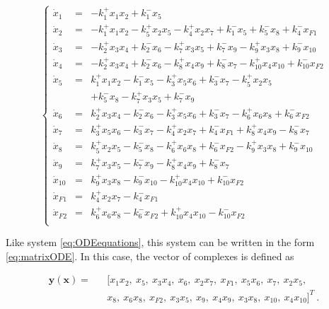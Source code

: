     \begin{equation} \label{eq:ODEequationsExp}
        \left\lbrace\begin{array}{lll}
            \dot{x}_1 &=& - k_1^+ x_1 x_2 + k_1^- x_5    \\
            \dot{x}_2 &=& - k_1^+ x_1 x_2 - k_5^+ x_2 x_5 - k_4^+ x_2 x_7 + k_1^- x_5 + k_{5}^- x_8 + k_4^- x_{F1}  \\
            \dot{x}_3 &=& - k_2^+ x_3 x_4 + k_2^- x_6 - k_{7}^+ x_3 x_5 + k_{7}^- x_{9} - k_{9}^+ x_3 x_8 + k_{9}^- x_{10}  \\
            \dot{x}_4 &=& - k_2^+ x_3 x_4 + k_2^- x_6 - k_{8}^+ x_4 x_9 + k_{8}^- x_{7} - k_{10}^+ x_4 x_{10} + k_{10}^- x_{F2}  \\
            \dot{x}_5 &=&   k_1^+ x_1 x_2 - k_1^- x_5 - k_3^+ x_5 x_6 + k_3^- x_7 - k_5^+ x_2 x_5 \\
             &  & + k_{5}^- x_8 - k_{7}^+ x_3 x_5 + k_{7}^- x_{9}  \\
            \dot{x}_6 &=&   k_2^+ x_3 x_4 - k_2^- x_6 - k_3^+ x_5 x_6 + k_3^- x_7 - k_{6}^+ x_6 x_8 + k_{6}^- x_{F2}  \\
            \dot{x}_7 &=&   k_3^+ x_5 x_6 - k_3^- x_7 - k_4^+ x_2 x_7 + k_4^- x_{F1} + k_{8}^+ x_4 x_9 - k_{8}^- x_{7}   \\
            \dot{x}_8 &=&   k_5^+ x_2 x_5 - k_{5}^- x_8 - k_{6}^+ x_6 x_8 + k_{6}^- x_{F2} - k_{9}^+ x_3 x_8 + k_{9}^- x_{10} \\
            \dot{x}_9 &=&   k_{7}^+ x_3 x_5 - k_{7}^- x_{9} - k_{8}^+ x_4 x_{9} + k_{8}^- x_{7}   \\
            \dot{x}_{10} &=& k_{9}^+ x_3 x_8 - k_{9}^- x_{10} - k_{10}^+ x_4 x_{10} + k_{10}^- x_{F2}   \\
            \dot{x}_{F1} &=& k_4^+ x_2 x_7 - k_4^- x_{F1}  \\
            \dot{x}_{F2} &=& k_{6}^+ x_6 x_8 - k_{6}^- x_{F2} + k_{10}^+ x_4 x_{10} - k_{10}^- x_{F2} \\
        \end{array}
        \right.
    \end{equation}

    Like system \eqref{eq:ODEequations}, this system can be written in
    the form \eqref{eq:matrixODE}.  In this case, the vector of
    complexes is defined as

    \begin{eqnarray}
        \mathbf{y(x)} = &&[x_1 x_2,~x_5,~x_3 x_4,~x_6,~x_2 x_7,~ x_{F1},~ x_5
        x_6,~ x_7,~ x_2 x_5, \nonumber \\
        && x_8,~ x_6 x_8,~ x_{F2},~ x_3 x_5,~ x_{9},~ x_4 x_{9},~ x_3
        x_8,~ x_{10},~ x_4 x_{10}]^T~. \label{eq:yExp}
    \end{eqnarray}

